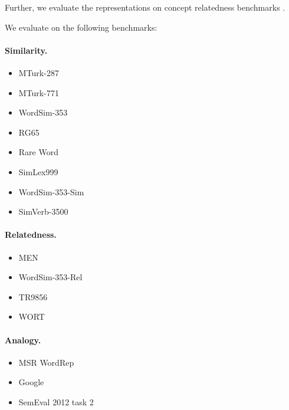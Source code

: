 \documentclass{article}
\begin{document}
    Further, we evaluate the representations on concept relatedness benchmarks
\cite{levy2015tr9856,eindor2018semantic}.
    
    We evaluate on the following benchmarks:
    
    \paragraph{Similarity.}
    
    \begin{itemize}
        \item MTurk-287~\cite{radinsky2011word}
        \item MTurk-771~\cite{halawi2012large}
        \item WordSim-353~\cite{finkelstein2001placing}
        \item RG65~\cite{rubenstein1965contextual}
        \item Rare Word~\cite{luong2013better}
        \item SimLex999~\cite{hill2015simlex}
        \item WordSim-353-Sim~\cite{agirre2009study}
        \item SimVerb-3500~\cite{Gerz2016emnlp}
    \end{itemize}
    
    \paragraph{Relatedness.}
    
    \begin{itemize}
        \item MEN~\cite{bruni2012distributional}
        \item WordSim-353-Rel~\cite{zesch2008using}
        \item TR9856~\cite{levy2015tr9856}
        \item WORT~\cite{eindor2018semantic}
    \end{itemize}
    
    \paragraph{Analogy.}
    
    \begin{itemize}
        \item MSR WordRep~\cite{gao2014wordrep}
        \item Google~\cite{mikolov2013distributed}
        \item SemEval 2012 task 2~\cite{jurgens2012semeval}
    \end{itemize}
    
\end{document}
